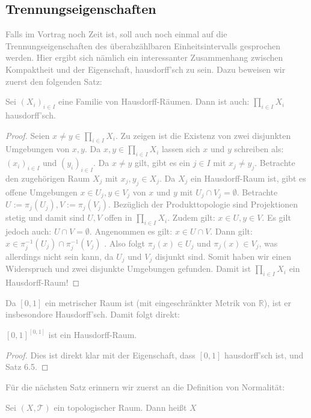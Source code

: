 \documentclass[11pt]{scrartcl}
\newcommand{\R}{\mathbb{R}}
\begin{document}
\subsection{Trennungseigenschaften}
\textcolor{gray}{
Falls im Vortrag noch Zeit ist, soll auch noch einmal auf die Trennungseigenschaften des überabzählbaren Einheitsintervalls gesprochen werden. Hier ergibt sich nämlich ein interessanter Zusammenhang
zwischen Kompaktheit und der Eigenschaft, hausdorff'sch zu sein. Dazu beweisen wir zuerst den folgenden Satz:
\begin{theorem}
	Sei $(X_i)_{i\in I}$ eine Familie von Hausdorff-Räumen. Dann ist auch: $\prod_{i\in I} X_i$ hausdorff'sch.
\end{theorem}
\begin{proof}
	Seien $x\neq y \in \prod_{i\in I} X_i$. Zu zeigen ist die Existenz von zwei disjunkten Umgebungen von $x,y$. Da $x,y\in \prod_{i\in I} X_i$ lassen sich $x$ und $y$ schreiben als: $(x_i)_{i\in I}$ und
	$(y_i)_{i\in I}$. Da $x\neq y$ gilt, gibt es ein $j\in I$ mit $x_j \neq y_j$. Betrachte den zugehörigen Raum $X_j$ mit $x_j, y_j\in X_j$. Da $X_j$ ein Hausdorff-Raum ist, gibt es offene Umgebungen 
	$x\in U_j, y\in V_j$ von $x$ und $y$ mit $U_j \cap V_j = \emptyset$. Betrachte $U:=\pi_{j}(U_j), V:= \pi_{j}(V_j)$. Bezüglich der Produkttopologie sind Projektionen stetig und damit sind
	$U,V$ offen in $\prod_{i\in I}X_i$. Zudem gilt: $x\in U, y\in V$. Es gilt jedoch auch: $U\cap V = \emptyset$. Angenommen es gilt: $x\in U\cap V$. Dann gilt: $x\in \pi_{j}^{-1}(U_j)\cap \pi_{j}^{-1}(V_j)$
	. Also folgt $\pi_j(x)\in U_j$ und $\pi_j(x)\in V_j$, was allerdings nicht sein kann, da $U_j$ und $V_j$ disjunkt sind. Somit haben wir einen Widerspruch und zwei disjunkte Umgebungen gefunden.
	Damit ist $\prod_{i\in I}X_i$ ein Hausdorff-Raum!
\end{proof}
Da $[0,1]$ ein metrischer Raum ist (mit eingeschränkter Metrik von $\R$), ist er insbesondore Hausdorff'sch. Damit folgt direkt:
\begin{corollary}
	$[0,1]^{[0,1]}$ ist ein Hausdorff-Raum.
\end{corollary}
\begin{proof}
	Dies ist direkt klar mit der Eigenschaft, dass $[0,1]$ hausdorff'sch ist, und Satz 6.5.
\end{proof}
Für die nächsten Satz erinnern wir zuerst an die Definition von Normalität:
\begin{definition}
	Sei $(X,\mathcal T)$ ein topologischer Raum. Dann heißt $X$ 
	\begin{itemize}

\end{itemize}
\end{definition}}
\end{document}
